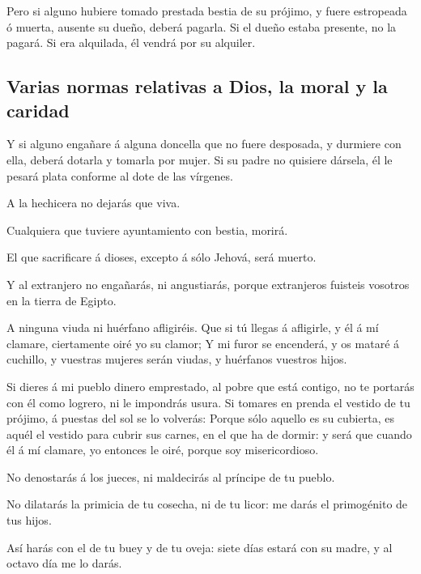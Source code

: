  Pero si alguno hubiere tomado prestada bestia de su
prójimo, y fuere estropeada ó muerta, ausente su dueño, deberá pagarla.
 Si el dueño estaba presente, no la pagará. Si era
alquilada, él vendrá por su alquiler.

\hypertarget{varias-normas-relativas-a-dios-la-moral-y-la-caridad}{%
\subsection{Varias normas relativas a Dios, la moral y la
caridad}\label{varias-normas-relativas-a-dios-la-moral-y-la-caridad}}

 Y si alguno engañare á alguna doncella que no fuere
desposada, y durmiere con ella, deberá dotarla y tomarla por mujer.
 Si su padre no quisiere dársela, él le pesará plata
conforme al dote de las vírgenes.

 A la hechicera no dejarás que viva.

 Cualquiera que tuviere ayuntamiento con bestia, morirá.

 El que sacrificare á dioses, excepto á sólo Jehová, será
muerto.

 Y al extranjero no engañarás, ni angustiarás, porque
extranjeros fuisteis vosotros en la tierra de Egipto.

 A ninguna viuda ni huérfano afligiréis.  Que
si tú llegas á afligirle, y él á mí clamare, ciertamente oiré yo su
clamor;  Y mi furor se encenderá, y os mataré á cuchillo, y
vuestras mujeres serán viudas, y huérfanos vuestros hijos.

 Si dieres á mi pueblo dinero emprestado, al pobre que está
contigo, no te portarás con él como logrero, ni le impondrás usura.
 Si tomares en prenda el vestido de tu prójimo, á puestas
del sol se lo volverás:  Porque sólo aquello es su
cubierta, es aquél el vestido para cubrir sus carnes, en el que ha de
dormir: y será que cuando él á mí clamare, yo entonces le oiré, porque
soy misericordioso.

 No denostarás á los jueces, ni maldecirás al príncipe de
tu pueblo.

 No dilatarás la primicia de tu cosecha, ni de tu licor: me
darás el primogénito de tus hijos.

 Así harás con el de tu buey y de tu oveja: siete días
estará con su madre, y al octavo día me lo darás.

